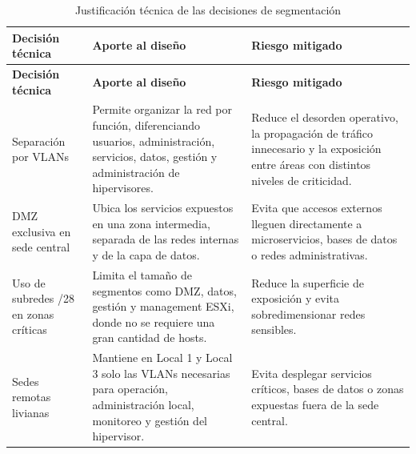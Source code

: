 \documentclass[11pt, a4paper, oneside]{report}
\begin{document}
\begin{xltabular}{\textwidth}{@{}|L{3.4cm}|X|X|@{}}
\caption{Justificación técnica de las decisiones de segmentación}
\label{tab:justificacion_segmentacion_red} \\

\parbox[c][1.1cm][c]{\linewidth}{\centering\color{white}\bfseries\small Decisión técnica} &
\parbox[c][1.1cm][c]{\linewidth}{\centering\color{white}\bfseries\small Aporte al diseño} &
\parbox[c][1.1cm][c]{\linewidth}{\centering\color{white}\bfseries\small Riesgo mitigado} \\ \hline
\endfirsthead

\parbox[c][1.1cm][c]{\linewidth}{\centering\color{white}\bfseries\small Decisión técnica} &
\parbox[c][1.1cm][c]{\linewidth}{\centering\color{white}\bfseries\small Aporte al diseño} &
\parbox[c][1.1cm][c]{\linewidth}{\centering\color{white}\bfseries\small Riesgo mitigado} \\ \hline
\endhead

\hline
\endfoot

{\small Separación por VLANs} &
{\small Permite organizar la red por función, diferenciando usuarios, administración, servicios, datos, gestión y administración de hipervisores.} &
{\small Reduce el desorden operativo, la propagación de tráfico innecesario y la exposición entre áreas con distintos niveles de criticidad.} \\ \hline

{\small DMZ exclusiva en sede central} &
{\small Ubica los servicios expuestos en una zona intermedia, separada de las redes internas y de la capa de datos.} &
{\small Evita que accesos externos lleguen directamente a microservicios, bases de datos o redes administrativas.} \\ \hline

{\small Uso de subredes /28 en zonas críticas} &
{\small Limita el tamaño de segmentos como DMZ, datos, gestión y management ESXi, donde no se requiere una gran cantidad de hosts.} &
{\small Reduce la superficie de exposición y evita sobredimensionar redes sensibles.} \\ \hline

{\small Sedes remotas livianas} &
{\small Mantiene en Local 1 y Local 3 solo las VLANs necesarias para operación, administración local, monitoreo y gestión del hipervisor.} &
{\small Evita desplegar servicios críticos, bases de datos o zonas expuestas fuera de la sede central.} \\ \hline


\end{xltabular}
\end{document}
